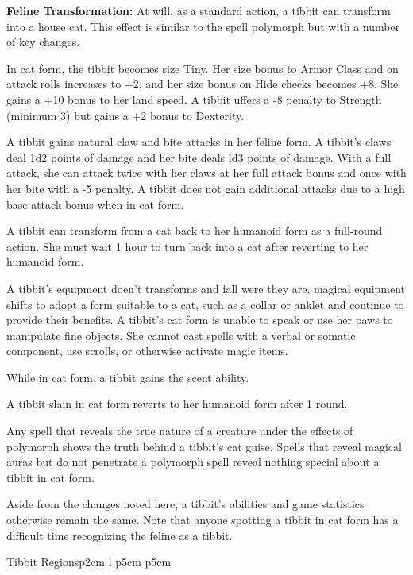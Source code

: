 \pagebreak

\textbf{Feline Transformation:} At will, as a standard action, a tibbit can transform into a house cat. This effect is similar to the spell polymorph but with a number of key changes.

In cat form, the tibbit becomes size Tiny. Her size bonus to Armor Class and on attack rolls increases to +2, and her size bonus on Hide checks becomes +8. She gains a +10 bonus to her land speed. A tibbit uffers a -8 penalty to Strength (minimum 3) but gains a +2 bonus to Dexterity.

A tibbit gains natural claw and bite attacks in her feline form. A tibbit's claws deal 1d2 points of damage and her bite deals ld3 points of damage. With a full attack, she can attack twice with her claws at her full attack bonus and once with her bite with a -5 penalty. A tibbit does not gain additional attacks due to a high base attack bonus when in cat form.

A tibbit can transform from a cat back to her humanoid form as a full-round action. She must wait 1 hour to turn back into a cat after reverting to her humanoid form.

A tibbit's equipment doen't transforms and fall were they are, magical equipment shifts to adopt a form suitable to a cat, such as a collar or anklet and continue to provide their benefits.
A tibbit's cat form is unable to speak or use her paws to manipulate fine objects. She cannot cast spells with a verbal or somatic component, use scrolls, or otherwise activate magic items.

While in cat form, a tibbit gains the scent ability.

A tibbit slain in cat form reverts to her humanoid form after 1 round.

Any spell that reveals the true nature of a creature under the effects of polymorph shows the truth behind a tibbit's cat guise. Spells that reveal magical auras but do not penetrate a polymorph spell reveal nothing special about a tibbit in cat form.

Aside from the changes noted here, a tibbit's abilities and game statistics otherwise remain the same. Note that anyone spotting a tibbit in cat form has a difficult time recognizing the feline as a tibbit.

\begin{smallbasictable}{Tibbit Regions}{p{2cm} l p{5cm} p{5cm}}
\\
\end{smallbasictable}

\pagebreak